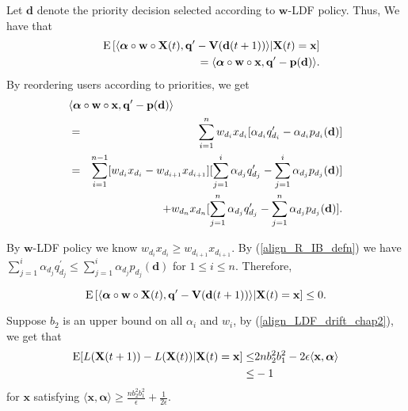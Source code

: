 \documentclass[prodmode,acmtompecs]{acmsmall}
\newcommand{\reqvec}{\mathbf{q}}
\newcommand{\reqscalar}{q}
\newcommand{\ribvec}{\boldsymbol{\alpha}}
\newcommand{\ribscalar}{\alpha}
\begin{document}
Let $\mathbf{d}$ denote the priority decision selected according to $\mathbf{w}$-LDF policy. Thus, We have that
\begin{eqnarray*}
& &\expectation\left[ \langle \ribvec \circ \mathbf{w} \circ \mathbf{X}(t), {\reqvec}^\prime - \mathbf{V}(\mathbf{d}(t+1)) \rangle | \mathbf{X}(t) = \mathbf{x} \right]\\
& &~~ = \langle \ribvec \circ \mathbf{w} \circ \mathbf{x}, {\reqvec}^\prime - \mathbf{p}(\mathbf{d}) \rangle. 
\end{eqnarray*}
By reordering users according to priorities, we get
\begin{eqnarray*}
\lefteqn{\langle \ribvec \circ \mathbf{w} \circ \mathbf{x}, {\reqvec}^\prime - \mathbf{p}(\mathbf{d}) \rangle}	\\
& = & \sum\limits_{i=1}^{n} w_{d_i} x_{d_i} [{\ribscalar}_{d_i} {\reqscalar}^\prime_{d_i} - {\ribscalar}_{d_i} p_{d_i}(\mathbf{d})]	\\
& = & \sum\limits_{i=1}^{n-1} [w_{d_i} x_{d_i} - w_{d_{i+1}} x_{d_{i+1}}] [\sum\limits_{j=1}^i {\ribscalar}_{d_j} {\reqscalar}^\prime_{d_j} - \sum\limits_{j=1}^i \ribscalar_{d_j} p_{d_j}(\mathbf{d})]	\\
& & + w_{d_n} x_{d_n} [\sum\limits_{j=1}^n {\ribscalar}_{d_j} {\reqscalar}^\prime_{d_j} - \sum\limits_{j=1}^n \ribscalar_{d_j} p_{d_j}(\mathbf{d})]. 
\end{eqnarray*}

By $\mathbf{w}$-LDF policy we know $w_{d_i} x_{d_i} \geq w_{d_{i+1}} x_{d_{i+1}}$. By (\ref{align_R_IB_defn}) we have $\sum\limits_{j=1}^i {\ribscalar}_{d_j} {\reqscalar}^\prime_{d_j} \leq \sum\limits_{j=1}^i \ribscalar_{d_j} p_{d_j}(\mathbf{d})$ for $1 \leq i \leq n$. Therefore, 

$$
\expectation\left[\langle \ribvec \circ \mathbf{w} \circ \mathbf{X}(t), {\reqvec}^\prime - \mathbf{V}(\mathbf{d}(t+1)) \rangle | \mathbf{X}(t) = \mathbf{x} \right] \leq 0. 
$$

Suppose $b_2$ is an upper bound on all ${\ribscalar}_i$ and $w_i$, by (\ref{align_LDF_drift_chap2}), we get that
\begin{align*}
\expectation[L(\mathbf{X}(t+1)) - L(\mathbf{X}(t)) | \mathbf{X}(t) = \mathbf{x}] \leq & 2n b_2^2 b_1^2 - 2 \epsilon \langle \mathbf{x}, \ribvec \rangle \\
\leq & -1
\end{align*}
for $\mathbf{x}$ satisfying $\langle\mathbf{x}, \ribvec\rangle \geq \frac{n b_2^2 b_1^2}{\epsilon} + \frac{1}{2\epsilon}$. 
\end{document}
